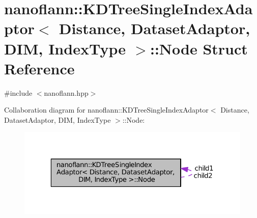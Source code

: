 \hypertarget{structnanoflann_1_1_k_d_tree_single_index_adaptor_1_1_node}{\section{nanoflann\-:\-:K\-D\-Tree\-Single\-Index\-Adaptor$<$ Distance, Dataset\-Adaptor, D\-I\-M, Index\-Type $>$\-:\-:Node Struct Reference}
\label{structnanoflann_1_1_k_d_tree_single_index_adaptor_1_1_node}
}


{\ttfamily \#include $<$nanoflann.\-hpp$>$}



Collaboration diagram for nanoflann\-:\-:K\-D\-Tree\-Single\-Index\-Adaptor$<$ Distance, Dataset\-Adaptor, D\-I\-M, Index\-Type $>$\-:\-:Node\-:\nopagebreak
\begin{figure}[H]
\begin{center}
\leavevmode
\includegraphics[width=323pt]{structnanoflann_1_1_k_d_tree_single_index_adaptor_1_1_node__coll__graph}
\end{center}
\end{figure}
